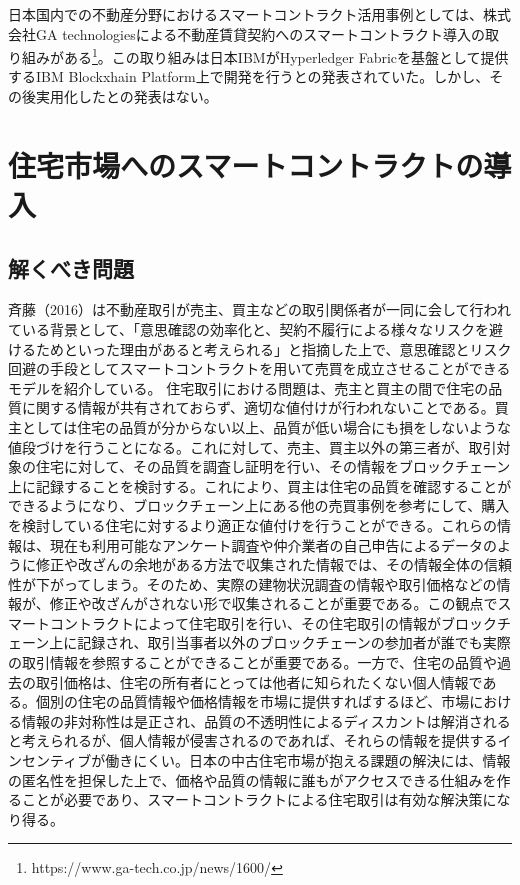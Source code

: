 \documentclass[a4paper,fontsize=11pt,report,notitlepage,line_length=38zw,number_of_lines=40]{jlreq}
\begin{document}
日本国内での不動産分野におけるスマートコントラクト活用事例としては、株式会社GA technologiesによる不動産賃貸契約へのスマートコントラクト導入の取り組みがある\footnote{https://www.ga-tech.co.jp/news/1600/}。この取り組みは日本IBMがHyperledger Fabricを基盤として提供するIBM Blockxhain Platform上で開発を行うとの発表されていた。しかし、その後実用化したとの発表はない。


\chapter{住宅市場へのスマートコントラクトの導入}
\section{解くべき問題}
斉藤（2016）は不動産取引が売主、買主などの取引関係者が一同に会して行われている背景として、「意思確認の効率化と、契約不履行による様々なリスクを避けるためといった理由があると考えられる」と指摘した上で、意思確認とリスク回避の手段としてスマートコントラクトを用いて売買を成立させることができるモデルを紹介している。
住宅取引における問題は、売主と買主の間で住宅の品質に関する情報が共有されておらず、適切な値付けが行われないことである。買主としては住宅の品質が分からない以上、品質が低い場合にも損をしないような値段づけを行うことになる。これに対して、売主、買主以外の第三者が、取引対象の住宅に対して、その品質を調査し証明を行い、その情報をブロックチェーン上に記録することを検討する。これにより、買主は住宅の品質を確認することができるようになり、ブロックチェーン上にある他の売買事例を参考にして、購入を検討している住宅に対するより適正な値付けを行うことができる。これらの情報は、現在も利用可能なアンケート調査や仲介業者の自己申告によるデータのように修正や改ざんの余地がある方法で収集された情報では、その情報全体の信頼性が下がってしまう。そのため、実際の建物状況調査の情報や取引価格などの情報が、修正や改ざんがされない形で収集されることが重要である。この観点でスマートコントラクトによって住宅取引を行い、その住宅取引の情報がブロックチェーン上に記録され、取引当事者以外のブロックチェーンの参加者が誰でも実際の取引情報を参照することができることが重要である。一方で、住宅の品質や過去の取引価格は、住宅の所有者にとっては他者に知られたくない個人情報である。個別の住宅の品質情報や価格情報を市場に提供すればするほど、市場における情報の非対称性は是正され、品質の不透明性によるディスカントは解消されると考えられるが、個人情報が侵害されるのであれば、それらの情報を提供するインセンティブが働きにくい。日本の中古住宅市場が抱える課題の解決には、情報の匿名性を担保した上で、価格や品質の情報に誰もがアクセスできる仕組みを作ることが必要であり、スマートコントラクトによる住宅取引は有効な解決策になり得る。
\end{document}
